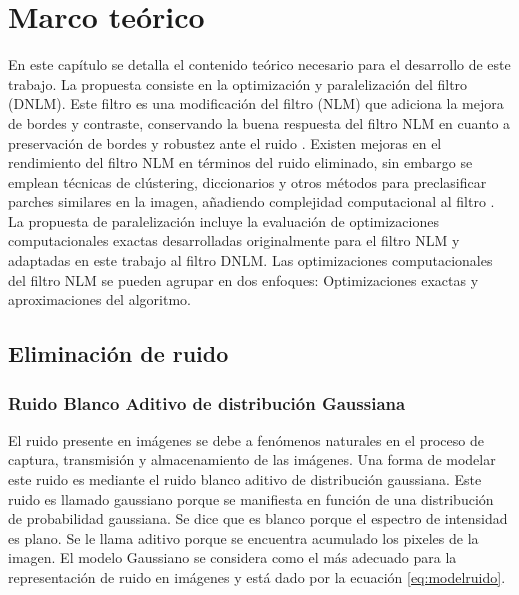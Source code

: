 \chapter{Marco teórico}
\label{ch:marco}


En este cap\'itulo se detalla el contenido te\'orico necesario para el desarrollo de este trabajo. La propuesta consiste en la optimizaci\'on y paralelizaci\'on del filtro  (DNLM). Este filtro es una modificaci\'on del filtro  (NLM) que adiciona la mejora de bordes y contraste, conservando la buena respuesta del filtro NLM en cuanto a preservaci\'on de bordes y robustez ante el ruido \cite{calderon2015dewaff}. 
Existen mejoras en el rendimiento del filtro NLM en t\'erminos del ruido eliminado, sin embargo se emplean t\'ecnicas de cl\'ustering, diccionarios y otros m\'etodos para preclasificar parches similares en la imagen, a\~nadiendo complejidad computacional al filtro \cite{pardoNLM:2018,Chan2013,Tasdizen2009,Chatterjee2008,JI20091238,Karam2018}. 
La propuesta de paralelizaci\'on incluye la evaluaci\'on de optimizaciones computacionales exactas desarrolladas originalmente para el filtro NLM y adaptadas en este trabajo al filtro DNLM. Las optimizaciones computacionales del filtro NLM se pueden agrupar en dos enfoques: Optimizaciones exactas y aproximaciones del algoritmo.



\section{Eliminaci\'on de ruido}

\subsection{Ruido Blanco Aditivo de distribuci\'on Gaussiana}
\label{ch:marco_agwn}

El ruido presente en im\'agenes se debe a fen\'omenos naturales en el proceso de captura, transmisi\'on y almacenamiento de las im\'agenes. 	Una forma de modelar este ruido es mediante el ruido blanco aditivo de distribuci\'on gaussiana. Este ruido es llamado gaussiano porque se manifiesta en funci\'on de una distribuci\'on de probabilidad gaussiana. Se dice que es blanco porque el espectro de intensidad es plano. Se le llama aditivo porque se encuentra acumulado los pixeles de la imagen. El modelo Gaussiano se considera como el m\'as adecuado para la representaci\'on de ruido en im\'agenes y est\'a dado por la ecuaci\'on \ref{eq:modelruido}.

